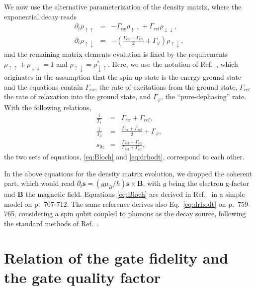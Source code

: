 \documentclass[aps, prx, showpacs, twocolumn, superscriptaddress, notitlepage, longbibliography, floatfix, nofootinbib]{revtex4-2}
\begin{document}
We now use the alternative parameterization of the density matrix, where the exponential decay reads
\begin{subequations}
\begin{eqnarray}
\partial_t \rho_{\uparrow\uparrow} &=&-\Gamma_{ex} \rho_{\uparrow\uparrow} + \Gamma_{rel} \rho_{\downarrow\downarrow} ,\\
\partial_t \rho_{\uparrow\downarrow} &=&-\left( \frac{\Gamma_{ex}+\Gamma_{rel}}{2} + \Gamma_\varphi \right) \rho_{\uparrow\downarrow},
\end{eqnarray}
\label{eq:drhodt}
\end{subequations}
and the remaining matrix elements evolution is fixed by the requirements $\rho_{\uparrow\uparrow}+\rho_{\downarrow\downarrow} =1$ and $\rho_{\uparrow\downarrow} = \rho_{\downarrow\uparrow}^*$. Here, we use the notation of Ref.~\cite{ithier_decoherence_2005}, which originates in the assumption that the spin-up state is the energy ground state and the equations contain $\Gamma_{ex}$, the rate of excitations from the ground state, $\Gamma_{rel}$ the rate of relaxation into the ground state, and $\Gamma_\varphi$, the ``pure-dephasing'' rate. With the following relations,
\begin{subequations}
\begin{eqnarray}
\frac{1}{T_1} &=&\Gamma_{ex} + \Gamma_{rel},\\
\frac{1}{T_2} &=&\frac{\Gamma_{ex} + \Gamma_{rel}}{2} + \Gamma_\varphi,\\
s_{0z} &=& \frac{\Gamma_{rel} - \Gamma_{ex}}{\Gamma_{rel} + \Gamma_{ex}},
\end{eqnarray}
\end{subequations}
the two sets of equations, \eqref{eq:Bloch} and \eqref{eq:drhodt}, correspond to each other.

In the above equations for the density matrix evolution, we dropped the coherent part, which would read $\partial_t \mathbf{s} = (g \mu_B / \hbar) \mathbf{s} \times \mathbf{B}$, with $g$ being the electron g-factor and $\mathbf{B}$ the magnetic field. Equations \eqref{eq:Bloch} are derived in Ref.~\cite{fabian_semiconductor_2007} in a simple model on p.~707-712. The same reference derives also Eq.~\eqref{eq:drhodt} on p.~759-765, considering a spin qubit coupled to phonons as the decay source, following the standard methods of Ref.~\cite{blum_density_1996}.

\section{Relation of the gate fidelity and the gate quality factor}
\end{document}
